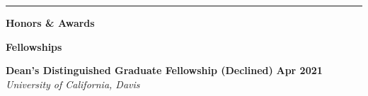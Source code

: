 \documentclass[10pt]{letter}
\begin{document}
\par\noindent\rule{\textwidth}{0.5pt}





\begin{center}
\textbf{\large Honors \& Awards} \\
\end{center}
\vspace{-5pt}
\begin{center}
\textbf{Fellowships} \\
\end{center}
\vspace{-5pt}
\textbf{Dean's Distinguished Graduate Fellowship (Declined)}
\hfill
\textbf{Apr 2021} \\
\textit{University of California, Davis}
\end{document}
